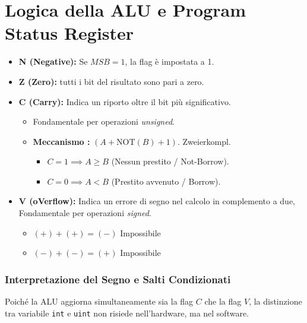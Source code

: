\section{Logica della ALU e Program Status Register}
\begin{itemize}
    \item \textbf{N (Negative):} Se $MSB=1$, la flag è impostata a 1.
    \item \textbf{Z (Zero):} tutti i bit del risultato sono pari a zero.
    \item \textbf{C (Carry):} Indica un riporto oltre il bit più significativo. 
\begin{itemize}
    \item Fondamentale per operazioni \textit{unsigned}. 
    \item \textbf{Meccanismo :} $(A + \text{NOT}(B) + 1)$. \quad Zweierkompl.
    \begin{itemize}
        \item $C = 1 \implies A \ge B$ (Nessun prestito / Not-Borrow).
        \item $C = 0 \implies A < B$ (Prestito avvenuto / Borrow).
    \end{itemize}
\end{itemize}
    \item \textbf{V (oVerflow):} Indica un errore di segno nel calcolo in complemento 
    a due, Fondamentale per operazioni \textit{signed}.
    \begin{itemize}
        \item $(+) + (+) = (-)$ Impossibile
        \item $(-) + (-) = (+)$ Impossibile
    \end{itemize}
\end{itemize}

\subsubsection{Interpretazione del Segno e Salti Condizionati}
\label{subsec:sign_interpretation}

Poiché la ALU aggiorna simultaneamente sia la flag $C$ che la flag $V$,
la distinzione tra variabile \texttt{int} e \texttt{uint} non risiede nell'hardware, 
ma nel software.

